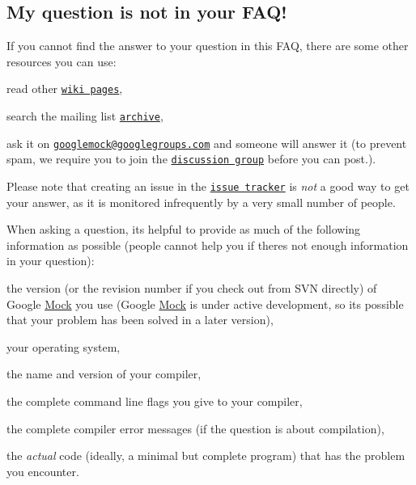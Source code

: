 \subsection*{My question is not in your F\+A\+Q!}

If you cannot find the answer to your question in this F\+AQ, there are some other resources you can use\+:


\begin{DoxyEnumerate}
\item read other \href{http://code.google.com/p/googlemock/w/list}{\tt wiki pages},
\end{DoxyEnumerate}
\begin{DoxyEnumerate}
\item search the mailing list \href{http://groups.google.com/group/googlemock/topics}{\tt archive},
\end{DoxyEnumerate}
\begin{DoxyEnumerate}
\item ask it on \href{mailto:googlemock@googlegroups.com}{\tt googlemock@googlegroups.\+com} and someone will answer it (to prevent spam, we require you to join the \href{http://groups.google.com/group/googlemock}{\tt discussion group} before you can post.).
\end{DoxyEnumerate}

Please note that creating an issue in the \href{http://code.google.com/p/googlemock/issues/list}{\tt issue tracker} is {\itshape not} a good way to get your answer, as it is monitored infrequently by a very small number of people.

When asking a question, it\textquotesingle{}s helpful to provide as much of the following information as possible (people cannot help you if there\textquotesingle{}s not enough information in your question)\+:


\begin{DoxyItemize}
\item the version (or the revision number if you check out from S\+VN directly) of Google \hyperlink{class_mock}{Mock} you use (Google \hyperlink{class_mock}{Mock} is under active development, so it\textquotesingle{}s possible that your problem has been solved in a later version),
\item your operating system,
\item the name and version of your compiler,
\item the complete command line flags you give to your compiler,
\item the complete compiler error messages (if the question is about compilation),
\item the {\itshape actual} code (ideally, a minimal but complete program) that has the problem you encounter. 
\end{DoxyItemize}